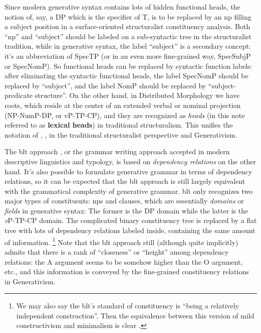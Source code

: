 \documentclass[UTF8, a4paper, oneside, scheme=plain, 12pt]{ctexrep}
\newcommand*{\concept}[1]{\textbf{#1}}
\newcommand*{\term}[1]{\emph{#1}}
\newcommand{\vP}{\textit{v}P}
\begin{document}
{Since modern generative syntax contains lots of hidden functional heads,
the notion of, say, a DP which is the specifier of T,
is to be replaced by an \acs{np} filling a subject position 
in a surface-oriented structuralist constituency analysis. 
Both ``\acs{np}'' and ``subject'' should be labeled on a sub-syntactic tree
in the structuralist tradition,
while in generative syntax,
the label ``subject'' is a secondary concept:
it's an abbreviation of SpecTP (or in an even more fine-grained way, SpecSubjP or SpecNomP).
So functional heads can be replaced by syntactic function labels:
after eliminating the syntactic functional heads, 
the label SpecNomP should be replaced by ``subject'',
and the label NomP should be replaced by ``subject-predicate structure''.
On the other hand,
in Distributed Morphology we have roots,
which reside at the center of an extended verbal or nominal projection
(NP-NumP-DP, or vP-TP-CP),
and they are recognized as \term{heads} 
(in this note referred to as \concept{lexical heads})
in traditional structuralism.
This unifies the notation of
\citet{cgel}, \citet{chao1965grammar}, \citet{zhudexigrammar}
in the traditional structuralist perspective
and Generativism.

The \ac{blt} approach \citep{dixon2009basic}, 
or the grammar writing approach accepted in 
modern descriptive linguistics and typology,
is based on \emph{dependency relations} on the other hand.
It's also possible to formulate generative grammar in terms of dependency relations,
so it can be expected that the \acs{blt} approach is still largely equivalent 
with the grammatical complexity of generative grammar.
\acs{blt} only recognizes two major types of constituents:
\acs{np}s and clauses,
which are essentially \term{domains} or \term{fields} in generative syntax:
The former is the DP domain while the latter is the \vP{}-TP-CP domain.
The complicated binary constituency tree is replaced by a flat tree 
with lots of dependency relations labeled inside,
containing the same amount of information.%
\footnote{
    We may also say the \acl{blt}'s standard of constituency 
    is ``being a relatively independent construction''. 
    Then the equivalence between this version of mild constructivism and minimalism 
    is clear \citep{construction-minimalism}.
}
Note that the \acl{blt} approach still (although quite implicitly) admits 
that there is a rank of ``closeness'' or ``height'' among dependency relations: 
the A argument seems to be somehow higher than the O argument, etc.,
and this information is conveyed by the fine-grained constituency relations 
in Generativism.

}
\end{document}
